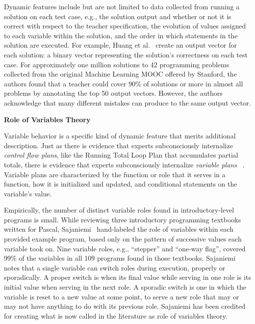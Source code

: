 Dynamic features include but are not limited to data collected from running a solution on each test case, e.g., the solution output and whether or not it is correct with respect to the teacher specification, the evolution of values assigned to each variable within the solution, and the order in which statements in the solution are executed. For example, Huang et al.~\cite{MOOCshop} create an output vector for each solution: a binary vector representing the solution's correctness on each test case. For approximately one million solutions to 42 programming problems collected from the original Machine Learning MOOC offered by Stanford, the authors found that a teacher could cover 90\% of solutions or more in almost all problems by annotating the top 50 output vectors. However, the authors acknowledge that many different mistakes can produce to the same output vector.

{\bf Role of Variables Theory}

Variable behavior is a specific kind of dynamic feature that merits additional description. Just as there is evidence that experts subconsciously internalize {\it control flow plans}, like the Running Total Loop Plan that accumulates partial totals, there is evidence that experts subconsciously internalize {\it variable plans} ~\cite{variableplans}. Variable plans are characterized by the function or role that it serves in a function, how it is initialized and updated, and conditional statements on the variable's value. 

Empirically, the number of distinct variable roles found in introductory-level programs is small. While reviewing three introductory programming textbooks written for Pascal, Sajaniemi~\cite{sajaniemi2002empirical} hand-labeled the role of variables within each provided example program, based only on the pattern of successive values each variable took on. Nine variable roles, e.g., ``stepper'' and ``one-way flag'', covered 99\% of the variables in all 109 programs found in those textbooks. Sajaniemi notes that a single variable can switch roles during execution, properly or sporadically. A proper switch is when its final value while serving in one role is its initial value when serving in the next role. A sporadic switch is one in which the variable is reset to a new value at some point, to serve a new role that may or may not have anything to do with its previous role.  Sajaniemi has been credited for creating what is now called in the literature as role of variables theory. 

